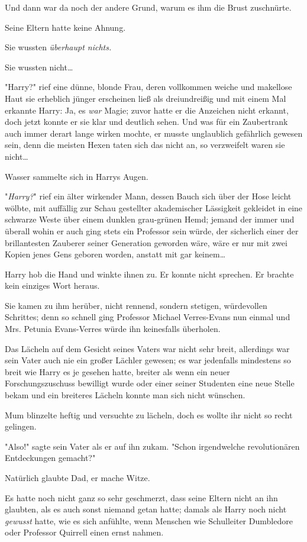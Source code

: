{Und dann war da noch der andere Grund, warum es ihm die Brust zuschnürte.

Seine Eltern hatte keine Ahnung.

Sie wussten \emph{überhaupt nichts.}

Sie wussten nicht…

"Harry?" rief eine dünne, blonde Frau, deren vollkommen weiche und makellose Haut sie erheblich jünger erscheinen ließ als dreiundreißig und mit einem Mal erkannte Harry: Ja, es \emph{war} Magie; zuvor hatte er die Anzeichen nicht erkannt, doch jetzt konnte er sie klar und deutlich sehen. Und was für ein Zaubertrank auch immer derart lange wirken mochte, er musste unglaublich gefährlich gewesen sein, denn die meisten Hexen taten sich das nicht an, so verzweifelt waren sie nicht…

Wasser sammelte sich in Harrys Augen.

"\emph{Harry?}" rief ein älter wirkender Mann, dessen Bauch sich über der Hose leicht wölbte, mit auffällig zur Schau gestellter akademischer Lässigkeit gekleidet in eine schwarze Weste über einem dunklen grau-grünen Hemd; jemand der immer und überall wohin er auch ging stets ein Professor sein würde, der sicherlich einer der brillantesten Zauberer seiner Generation geworden wäre, wäre er nur mit zwei Kopien jenes Gens geboren worden, anstatt mit gar keinem…

Harry hob die Hand und winkte ihnen zu. Er konnte nicht sprechen. Er brachte kein einziges Wort heraus.

Sie kamen zu ihm herüber, nicht rennend, sondern stetigen, würdevollen Schrittes; denn so schnell ging Professor Michael Verres-Evans nun einmal und Mrs. Petunia Evans-Verres würde ihn keinesfalls überholen.

Das Lächeln auf dem Gesicht seines Vaters war nicht sehr breit, allerdings war sein Vater auch nie ein großer Lächler gewesen; es war jedenfalls mindestens so breit wie Harry es je gesehen hatte, breiter als wenn ein neuer Forschungszuschuss bewilligt wurde oder einer seiner Studenten eine neue Stelle bekam und ein breiteres Lächeln konnte man sich nicht wünschen.

Mum blinzelte heftig und versuchte zu lächeln, doch es wollte ihr nicht so recht gelingen.

"Also!" sagte sein Vater als er auf ihn zukam. "Schon irgendwelche revolutionären Entdeckungen gemacht?"

Natürlich glaubte Dad, er mache Witze.

Es hatte noch nicht ganz so sehr geschmerzt, dass seine Eltern nicht an ihn glaubten, als es auch sonst niemand getan hatte; damals als Harry noch nicht \emph{gewusst} hatte, wie es sich anfühlte, wenn Menschen wie Schulleiter Dumbledore oder Professor Quirrell einen ernst nahmen.

}
